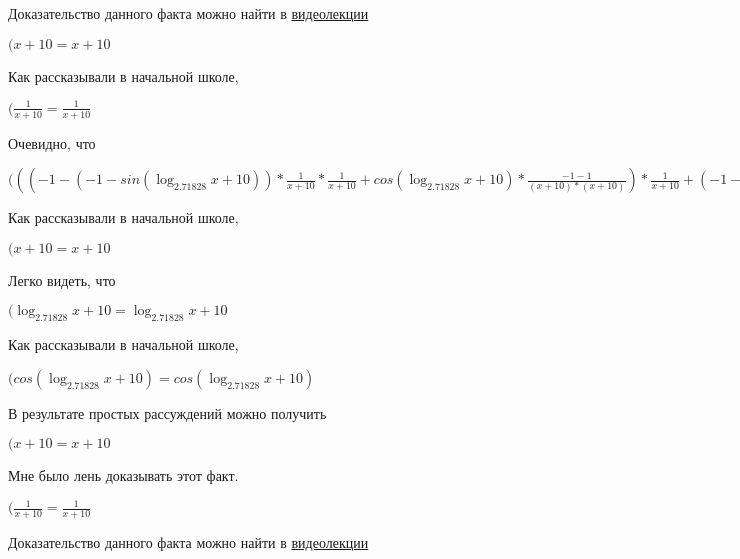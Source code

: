 \documentclass[12pt,a4paper,fleqn]{article}
\theoremstyle{definition}
\begin{document}
Доказательство данного факта можно найти в \href{https://www.youtube.com/watch?v=dQw4w9WgXcQ}{видеолекции}

$( x  +  10  =  x  +  10 $

Как рассказывали в начальной школе,

$(\frac{ 1 }{ x  +  10 }
 = \frac{ 1 }{ x  +  10 }
$

Очевидно, что

$((( -1  - ( -1  - sin(\log_{ 2.71828 }{ x  +  10 })) * \frac{ 1 }{ x  +  10 }
 * \frac{ 1 }{ x  +  10 }
 + cos(\log_{ 2.71828 }{ x  +  10 }) * \frac{ -1  -  1 }{( x  +  10 ) * ( x  +  10 )}
) * \frac{ 1 }{ x  +  10 }
 + ( -1  - cos(\log_{ 2.71828 }{ x  +  10 }) * \frac{ 1 }{ x  +  10 }
) * \frac{ -1  -  1 }{( x  +  10 ) * ( x  +  10 )}
 + ( -1  - cos(\log_{ 2.71828 }{ x  +  10 }) * \frac{ 1 }{ x  +  10 }
) * \frac{ -2 }{( x  +  10 ) * ( x  +  10 )}
 + ( -1  - sin(\log_{ 2.71828 }{ x  +  10 })) * \frac{ -1  -  -2  * ( x  +  10  +  x  +  10 )}{( x  +  10 ) * ( x  +  10 ) * ( x  +  10 ) * ( x  +  10 )}
) * \frac{ 1 }{ x  +  10 }
 = (( -1  - ( -1  - sin(\log_{ 2.71828 }{ x  +  10 })) * \frac{ 1 }{ x  +  10 }
 * \frac{ 1 }{ x  +  10 }
 + cos(\log_{ 2.71828 }{ x  +  10 }) * \frac{ -1  -  1 }{( x  +  10 ) * ( x  +  10 )}
) * \frac{ 1 }{ x  +  10 }
 + ( -1  - cos(\log_{ 2.71828 }{ x  +  10 }) * \frac{ 1 }{ x  +  10 }
) * \frac{ -1  -  1 }{( x  +  10 ) * ( x  +  10 )}
 + ( -1  - cos(\log_{ 2.71828 }{ x  +  10 }) * \frac{ 1 }{ x  +  10 }
) * \frac{ -2 }{( x  +  10 ) * ( x  +  10 )}
 + ( -1  - sin(\log_{ 2.71828 }{ x  +  10 })) * \frac{ -1  -  -2  * ( x  +  10  +  x  +  10 )}{( x  +  10 ) * ( x  +  10 ) * ( x  +  10 ) * ( x  +  10 )}
) * \frac{ 1 }{ x  +  10 }
$

Как рассказывали в начальной школе,

$( x  +  10  =  x  +  10 $

Легко видеть, что

$(\log_{ 2.71828 }{ x  +  10 } = \log_{ 2.71828 }{ x  +  10 }$

Как рассказывали в начальной школе,

$(cos(\log_{ 2.71828 }{ x  +  10 }) = cos(\log_{ 2.71828 }{ x  +  10 })$

В результате простых рассуждений можно получить

$( x  +  10  =  x  +  10 $

Мне было лень доказывать этот факт.

$(\frac{ 1 }{ x  +  10 }
 = \frac{ 1 }{ x  +  10 }
$

Доказательство данного факта можно найти в \href{https://www.youtube.com/watch?v=dQw4w9WgXcQ}{видеолекции}
\end{document}
